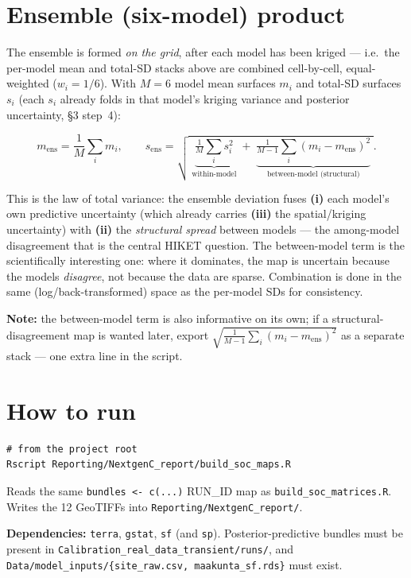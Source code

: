 \documentclass[11pt]{article}
\newcommand{\code}[1]{\texttt{\small #1}}
\begin{document}
\section{Ensemble (six-model) product}

The ensemble is formed \emph{on the grid}, after each model has been kriged ---
i.e.\ the per-model mean and total-SD stacks above are combined cell-by-cell,
equal-weighted ($w_i = 1/6$). With $M=6$ model mean surfaces $m_i$ and total-SD
surfaces $s_i$ (each $s_i$ already folds in that model's kriging variance and
posterior uncertainty, \S3 step~4):

\[
  m_{\text{ens}} = \frac{1}{M}\sum_i m_i,
  \qquad
  s_{\text{ens}} = \sqrt{\;
    \underbrace{\tfrac{1}{M}\textstyle\sum_i s_i^{2}}_{\text{within-model}}
    \;+\;
    \underbrace{\tfrac{1}{M-1}\textstyle\sum_i (m_i - m_{\text{ens}})^{2}}_{\text{between-model (structural)}}
  \;}.
\]

This is the law of total variance: the ensemble deviation fuses \textbf{(i)}
each model's own predictive uncertainty (which already carries \textbf{(iii)}
the spatial/kriging uncertainty) with \textbf{(ii)} the \emph{structural spread}
between models --- the among-model disagreement that is the central HIKET
question. The between-model term is the scientifically interesting one: where it
dominates, the map is uncertain because the models \emph{disagree}, not because
the data are sparse. Combination is done in the same (log/back-transformed)
space as the per-model SDs for consistency.

\textbf{Note:} the between-model term is also informative on its own; if a
structural-disagreement map is wanted later, export $\sqrt{\tfrac{1}{M-1}\sum_i
(m_i-m_{\text{ens}})^2}$ as a separate stack --- one extra line in the script.

\section{How to run}

\begin{verbatim}
# from the project root
Rscript Reporting/NextgenC_report/build_soc_maps.R
\end{verbatim}

Reads the same \code{bundles <- c(...)} RUN\_ID map as
\code{build\_soc\_matrices.R}. Writes the 12 GeoTIFFs into
\code{Reporting/NextgenC\_report/}.

\textbf{Dependencies:} \code{terra}, \code{gstat}, \code{sf} (and \code{sp}).
Posterior-predictive bundles must be present in
\code{Calibration\_real\_data\_transient/runs/}, and
\code{Data/model\_inputs/\{site\_raw.csv, maakunta\_sf.rds\}} must exist.
\end{document}
